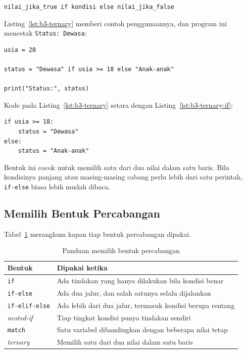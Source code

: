 \begin{lstlisting}[style=PythonStyle, caption={Bentuk dasar ternary operator di Python}, label={lst:b3-bentuk-ternary}]
nilai_jika_true if kondisi else nilai_jika_false
\end{lstlisting}

Listing~\ref{lst:b3-ternary} memberi contoh penggunaannya, dan program ini mencetak \texttt{Status: Dewasa}:

\begin{lstlisting}[style=PythonStyle, caption={Kode Python: ternary_operator.py}, label={lst:b3-ternary}]
usia = 20

status = "Dewasa" if usia >= 18 else "Anak-anak"

print("Status:", status)
\end{lstlisting}

Kode pada Listing~\ref{lst:b3-ternary} setara dengan Listing~\ref{lst:b3-ternary-if}:

\begin{lstlisting}[style=PythonStyle, caption={Bentuk if-else yang setara dengan operator ternary}, label={lst:b3-ternary-if}]
if usia >= 18:
    status = "Dewasa"
else:
    status = "Anak-anak"
\end{lstlisting}

Bentuk ini cocok untuk memilih satu dari dua nilai dalam satu baris. Bila kondisinya panjang atau masing-masing cabang perlu lebih dari satu perintah, \texttt{if-else} biasa lebih mudah dibaca.

\subsection{Memilih Bentuk Percabangan}
Tabel~\ref{tab:b3-pilih} merangkum kapan tiap bentuk percabangan dipakai.

\begin{table}[H]
  \centering
  \caption{Panduan memilih bentuk percabangan}
  \label{tab:b3-pilih}
  \begin{tabularx}{\textwidth}{lX}
    \hline
    \textbf{Bentuk} & \textbf{Dipakai ketika} \\
    \hline
    \texttt{if} & Ada tindakan yang hanya dilakukan bila kondisi benar \\
    \hline
    \texttt{if-else} & Ada dua jalur, dan salah satunya selalu dijalankan \\
    \hline
    \texttt{if-elif-else} & Ada lebih dari dua jalur, termasuk kondisi berupa rentang \\
    \hline
    \textit{nested-if} & Tiap tingkat kondisi punya tindakan sendiri \\
    \hline
    \texttt{match} & Satu variabel dibandingkan dengan beberapa nilai tetap \\
    \hline
    \textit{ternary} & Memilih satu dari dua nilai dalam satu baris \\
    \hline
  \end{tabularx}
\end{table}

